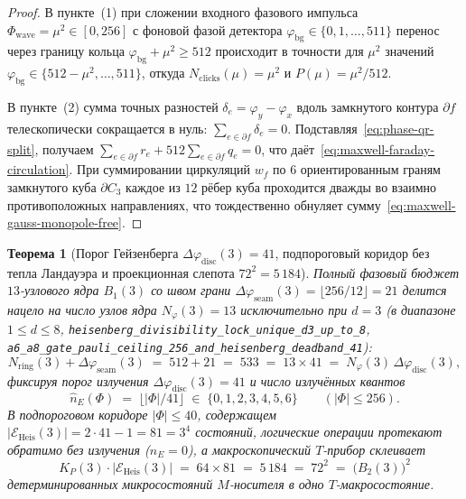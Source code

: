 \documentclass[11pt,a4paper]{article}
\theoremstyle{plain}
\newtheorem{theorem}{Теорема}[section]
\theoremstyle{definition}
\begin{document}
\begin{proof}
В пункте~(1) при сложении входного фазового импульса $\Phi_{\mathrm{wave}} = \mu^2 \in [0, 256]$ с фоновой фазой детектора $\varphi_{\mathrm{bg}} \in \{0, 1, \dots, 511\}$ перенос через границу кольца $\varphi_{\mathrm{bg}} + \mu^2 \ge 512$ происходит в точности для $\mu^2$ значений $\varphi_{\mathrm{bg}} \in \{512 - \mu^2, \dots, 511\}$, откуда $N_{\mathrm{clicks}}(\mu) = \mu^2$ и $P(\mu) = \mu^2 / 512$.

В пункте~(2) сумма точных разностей $\delta_e = \varphi_y - \varphi_x$ вдоль замкнутого контура $\partial f$ телескопически сокращается в нуль: $\sum_{e\in\partial f} \delta_e = 0$. Подставляя~\eqref{eq:phase-qr-split}, получаем $\sum_{e\in\partial f} r_e + 512\sum_{e\in\partial f} q_e = 0$, что даёт~\eqref{eq:maxwell-faraday-circulation}. При суммировании циркуляций $w_f$ по $6$ ориентированным граням замкнутого куба $\partial C_3$ каждое из $12$ рёбер куба проходится дважды во взаимно противоположных направлениях, что тождественно обнуляет сумму~\eqref{eq:maxwell-gauss-monopole-free}.
\end{proof}

\begin{theorem}[Порог Гейзенберга $\Delta\varphi_{\mathrm{disc}}(3)=41$, подпороговый коридор без тепла Ландауэра и проекционная слепота $72^2=5\,184$]
\label{thm:born-heisenberg-maxwell}
Полный фазовый бюджет $13$-узлового ядра $B_1(3)$ со швом грани $\Delta\varphi_{\mathrm{seam}}(3) = \lfloor 256/12\rfloor = 21$ делится нацело на число узлов ядра $N_\varphi(3) = 13$ исключительно при $d = 3$ (в диапазоне $1 \le d \le 8$, \texttt{heisenberg\_divisibility\_lock\_unique\_d3\_up\_to\_8}, \texttt{a6\_a8\_gate\_pauli\_ceiling\_256\_and\_heisenberg\_deadband\_41}):
\begin{equation}
  \label{eq:heisenberg-533-factorization}
  N_{\mathrm{ring}}(3) + \Delta\varphi_{\mathrm{seam}}(3) \;=\; 512 + 21 \;=\; 533 \;=\; 13 \times 41 \;=\; N_\varphi(3)\,\Delta\varphi_{\mathrm{disc}}(3),
\end{equation}
фиксируя порог излучения $\Delta\varphi_{\mathrm{disc}}(3) = 41$ и число излучённых квантов
\begin{equation}
  \label{eq:heisenberg-quantum-count}
  \hat{n}_E(\Phi) \;=\; \bigl\lfloor |\Phi| / 41 \bigr\rfloor \;\in\; \{0, 1, 2, 3, 4, 5, 6\}
  \qquad (|\Phi| \le 256).
\end{equation}
В подпороговом коридоре $|\Phi| \le 40$, содержащем $|\mathcal{E}_{\mathrm{Heis}}(3)| = 2\cdot 41 - 1 = 81 = 3^4$ состояний, логические операции протекают обратимо без излучения ($\hat{n}_E = 0$), а макроскопический $T$-прибор склеивает
\begin{equation}
  \label{eq:projection-blindness-5184}
  K_P(3)\cdot |\mathcal{E}_{\mathrm{Heis}}(3)| \;=\; 64 \times 81 \;=\; 5\,184 \;=\; 72^2 \;=\; \bigl(B_2(3)\bigr)^2
\end{equation}
детерминированных микросостояний $M$-носителя в одно $T$-макросостояние.
\end{theorem}
\end{document}
